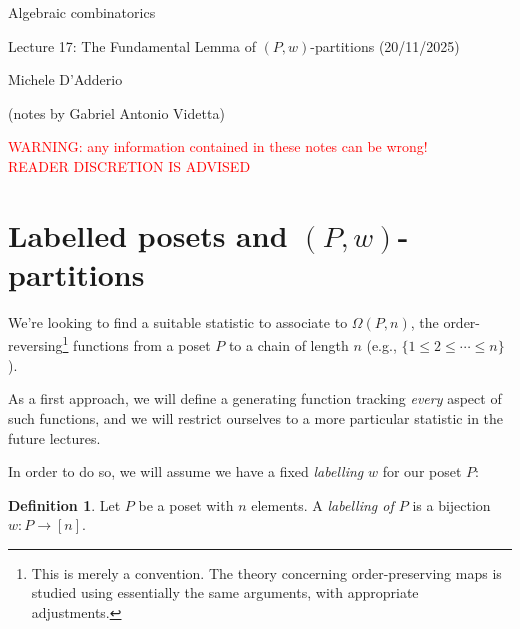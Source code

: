 \documentclass[11pt]{amsart}
\theoremstyle{plain}
\theoremstyle{definition}
\newtheorem{definition}{Definition}
\theoremstyle{remark}
\numberwithin{equation}{section}
\begin{document}
\begin{center}
	\huge{Algebraic combinatorics}
\end{center}

\bigskip

\begin{center}
	\Large{Lecture 17: The Fundamental Lemma of $(P, w)$-partitions (20/11/2025)}
\end{center}

\bigskip

\begin{center}
	\Large{Michele D'Adderio}
\end{center}
\smallskip
\begin{center}
	\large{(notes by Gabriel Antonio Videtta)}
\end{center}
\bigskip
\begin{center}
	\textcolor{red}{
		WARNING: any information contained in these notes can be wrong!}\\
	\textcolor{red}{READER DISCRETION IS ADVISED}
\end{center}

\tableofcontents

\section{Labelled posets and \texorpdfstring{$(P, w)$}{(P, w)}-partitions}

We're looking to find a suitable statistic to associate to $\Omega(P, n)$,
the order-reversing\footnote{
	This is merely a convention. The theory concerning order-preserving maps is
	studied using essentially the same arguments, with appropriate adjustments.
} functions from a poset $P$ to a chain of length $n$ (e.g., $\{1 \leq 2 \leq \cdots \leq n\}$). \medskip

As a first approach, we will define a generating function tracking \textit{every} aspect of such functions,
and we will restrict ourselves to a more particular statistic in the future lectures.

In order to do so, we will assume we have a fixed \textit{labelling} $w$ for our poset $P$:

\begin{definition}
	Let $P$ be a poset with $n$ elements. A \textit{labelling of $P$} is a bijection $w : P \to [n]$.
\end{definition}
\end{document}
